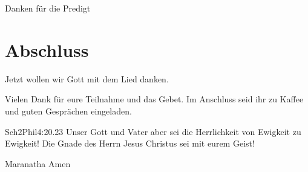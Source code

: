 \documentclass{../inc/mybib}
\begin{document}
Danken für die Predigt

\section{Abschluss}

Jetzt wollen wir Gott mit dem Lied  danken.


Vielen Dank für eure Teilnahme und das Gebet. Im Anschluss seid ihr zu Kaffee und guten Gesprächen eingeladen.
\beten{}

\begin{bibeltext}{Sch2}{Phil}{4:20.23}
Unser Gott und Vater aber sei die Herrlichkeit von Ewigkeit zu Ewigkeit!
Die Gnade des Herrn Jesus Christus sei mit eurem Geist!
\end{bibeltext}

Maranatha Amen
\end{document}
